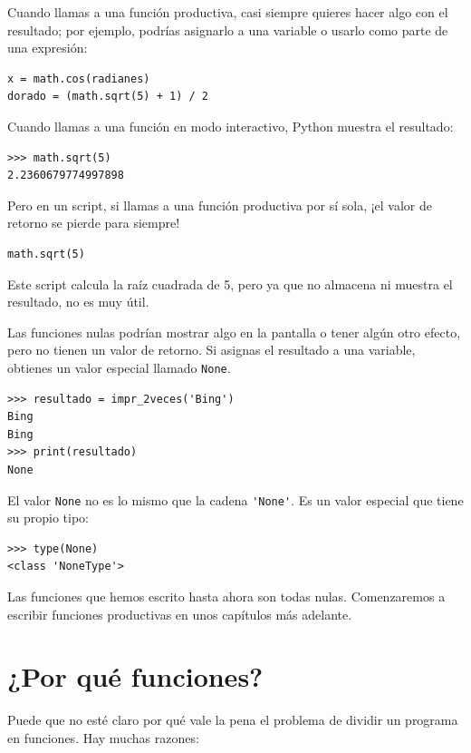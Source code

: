 \documentclass[10pt]{book}
\begin{document}
Cuando llamas a una función productiva, casi siempre
quieres hacer algo con el resultado; por ejemplo, podrías
asignarlo a una variable o usarlo como parte de una expresión:

\begin{verbatim}
x = math.cos(radianes)
dorado = (math.sqrt(5) + 1) / 2
\end{verbatim}
%
Cuando llamas a una función en modo interactivo, Python muestra
el resultado:

\begin{verbatim}
>>> math.sqrt(5)
2.2360679774997898
\end{verbatim}
%
Pero en un script, si llamas a una función productiva por sí sola,
¡el valor de retorno se pierde para siempre!

\begin{verbatim}
math.sqrt(5)
\end{verbatim}
%
Este script calcula la raíz cuadrada de 5, pero ya que no almacena
ni muestra el resultado, no es muy útil.

Las funciones nulas podrían mostrar algo en la pantalla o tener algún
otro efecto, pero no tienen un valor de retorno.  Si
asignas el resultado a una variable, obtienes un valor especial llamado
{\tt None}.

\begin{verbatim}
>>> resultado = impr_2veces('Bing')
Bing
Bing
>>> print(resultado)
None
\end{verbatim}
%
El valor {\tt None} no es lo mismo que la cadena \verb"'None'".
Es un valor especial que tiene su propio tipo:

\begin{verbatim}
>>> type(None)
<class 'NoneType'>
\end{verbatim}
%
Las funciones que hemos escrito hasta ahora son todas nulas.  Comenzaremos
a escribir funciones productivas en unos capítulos más adelante.


\section{¿Por qué funciones?}

Puede que no esté claro por qué vale la pena el problema de dividir
un programa en funciones.  Hay muchas razones:
\end{document}
